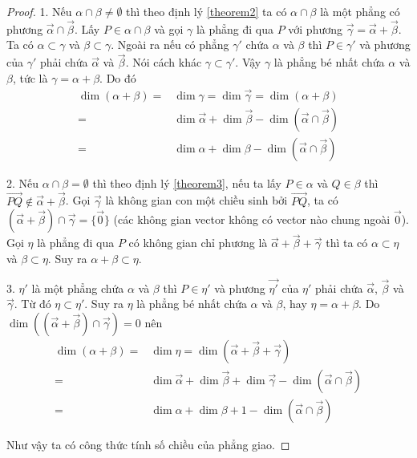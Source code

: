 \begin{proof}
	1. Nếu $\alpha \cap \beta \neq \emptyset$ thì theo định lý \ref{theorem2} ta có $\alpha \cap \beta$ là một phẳng có phương $\overrightarrow{\alpha} \cap \overrightarrow{\beta}$. Lấy $P \in \alpha \cap \beta$ và gọi $\gamma$ là phẳng đi qua $P$ với phương $\overrightarrow{\gamma} = \overrightarrow{\alpha} + \overrightarrow{\beta}$. Ta có $\alpha \subset \gamma$ và $\beta \subset \gamma$. Ngoài ra nếu có phẳng $\gamma'$ chứa $\alpha$ và $\beta$ thì $P \in \gamma'$ và phương của $\gamma'$ phải chứa $\overrightarrow{\alpha}$ và $\overrightarrow{\beta}$. Nói cách khác $\gamma \subset \gamma'$. Vậy $\gamma$ là phẳng bé nhất chứa $\alpha$ và $\beta$, tức là $\gamma = \alpha + \beta$. Do đó 
    \begin{align*}
        \dim(\alpha + \beta) = & \dim\gamma = \dim\overrightarrow{\gamma} = \dim(\alpha + \beta) \\ 
        = & \dim\overrightarrow{\alpha} + \dim\overrightarrow{\beta} - \dim(\overrightarrow{\alpha} \cap \overrightarrow{\beta}) \\ 
        = & \dim\alpha + \dim\beta - \dim(\overrightarrow{\alpha} \cap \overrightarrow{\beta})
    \end{align*}
	
    2. Nếu $\alpha \cap \beta = \emptyset$ thì theo định lý \ref{theorem3}, nếu ta lấy $P \in \alpha$ và $Q \in \beta$ thì $\overrightarrow{PQ} \not\in \overrightarrow{\alpha} + \overrightarrow{\beta}$. Gọi $\overrightarrow{\gamma}$ là không gian con một chiều sinh bởi $\overrightarrow{PQ}$, ta có $(\overrightarrow{\alpha} + \overrightarrow{\beta}) \cap \overrightarrow{\gamma} = \{ \overrightarrow{0} \}$ (các không gian vector không có vector nào chung ngoài $\overrightarrow{0}$). Gọi $\eta$ là phẳng đi qua $P$ có không gian chỉ phương là $\overrightarrow{\alpha} + \overrightarrow{\beta} + \overrightarrow{\gamma}$ thì ta có $\alpha \subset \eta$ và $\beta \subset \eta$. Suy ra $\alpha + \beta \subset \eta$.
		
	3. $\eta'$ là một phẳng chứa $\alpha$ và $\beta$ thì $P \in \eta'$ và phương $\overrightarrow{\eta'}$ của $\eta'$ phải chứa $\overrightarrow{\alpha}$, $\overrightarrow{\beta}$ và $\overrightarrow{\gamma}$. Từ đó $\eta \subset \eta'$. Suy ra $\eta$ là phẳng bé nhất chứa $\alpha$ và $\beta$, hay $\eta = \alpha + \beta$. Do $\dim((\overrightarrow{\alpha} + \overrightarrow{\beta}) \cap \overrightarrow{\gamma}) = 0$ nên
    \begin{align*}
        \dim(\alpha + \beta) = & \dim\eta = \dim(\overrightarrow{\alpha} + \overrightarrow{\beta} + \overrightarrow{\gamma}) \\ 
        = & \dim\overrightarrow{\alpha} + \dim\overrightarrow{\beta} + \dim\overrightarrow{\gamma} - \dim(\overrightarrow{\alpha} \cap \overrightarrow{\beta}) \\ 
        = & \dim\alpha + \dim\beta + 1 - \dim(\overrightarrow{\alpha} \cap \overrightarrow{\beta})
    \end{align*}

    Như vậy ta có công thức tính số chiều của phẳng giao.
\end{proof}

